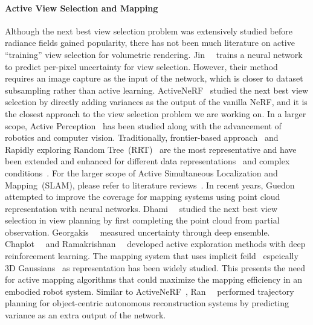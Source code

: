 \paragraph{Active View Selection and Mapping}
Although the next best view selection problem was extensively studied before radiance fields gained popularity, there has not been much literature on active ``training'' view selection for volumetric rendering. 
Jin~\etal~\cite{jin2023neu} trains a neural network to predict per-pixel uncertainty for view selection. However, their method requires an image capture as the input of the network, which is closer to dataset subsampling rather than active learning.
ActiveNeRF~\cite{pan2022activenerf} studied the next best view selection by directly adding variances as the output of the vanilla NeRF, and it is the closest approach to the view selection problem we are working on. 
In a larger scope, Active Perception~\cite{bajcsy1988active,bajcsy2018revisiting} has been studied along with the advancement of robotics and computer vision.
Traditionally, frontier-based approach~\cite{yamauchi1997frontier} and Rapidly exploring Random Tree~(RRT)~\cite{lavalle1998rrt} are the most representative and have been extended and enhanced for different data representations~\cite{zhu20153d, karaman2010incremental, dornhege2013frontier, shen2012autonomous} and complex conditions~\cite{ye2022multi, papachristos2017uncertainty}.
For the larger scope of Active Simultaneous Localization and Mapping~(SLAM), please refer to literature reviews~\cite{lluvia2021active-survey, placed2023survey}.
In recent years, Guedon~\etal~\cite{guedon2022scone,guedon2023macarons} attempted to improve the coverage for mapping systems using point cloud representation with neural networks. Dhami~\etal~\cite{dhami2023pred} studied the next best view selection in view planning by first completing the point cloud from partial observation. Georgakis~\etal~\cite{georgakis2022uncertainty} measured uncertainty through deep ensemble. Chaplot~\etal~\cite{chaplot2020learning} and Ramakrishnan~\etal~\cite{ramakrishnan2020occupancy} developed active exploration methods with deep reinforcement learning.
The mapping system that uses implicit feild~\cite{zhu2021niceslam, Sucar:etal:ICCV2021, Ortiz:etal:iSDF2022, sandstrom2023point} espeically 3D Gaussians~\cite{keetha2023splatam, yan2023gs, Matsuki:Murai:etal:CVPR2024,yugay2023gaussianslam} as representation has been widely studied.
This presents the need for active mapping algorithms that could maximize the mapping efficiency in an embodied robot system.
Similar to ActiveNeRF~\cite{pan2022activenerf}, Ran~\etal~\cite{Ran2023neurar} performed trajectory planning for object-centric autonomous reconstruction systems by predicting variance as an extra output of the network. 
